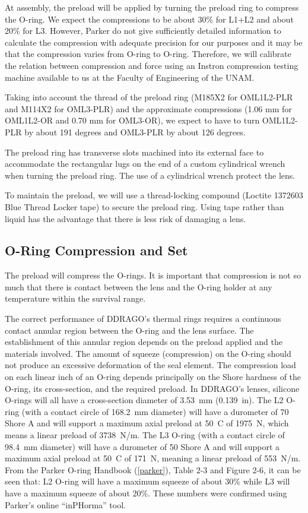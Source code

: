 \documentclass{article}
\begin{document}
At assembly, the preload will be applied by turning the preload ring to compress the O-ring. We expect the compressions to be about 30\% for L1+L2 and about 20\% for L3. However, Parker do not give sufficiently detailed information to calculate the compression with adequate precision for our purposes and it may be that the compression varies from O-ring to O-ring. Therefore, we will calibrate the relation between compression and force using an Instron compression testing machine available to us at the Faculty of Engineering of the UNAM.

Taking into account the thread of the preload ring (M185X2 for OML1L2-PLR and M114X2 for OML3-PLR) and the approximate compressions (1.06 mm for OML1L2-OR and 0.70 mm for OML3-OR), we expect to have to turn OML1L2-PLR by about 191 degrees and OML3-PLR by about 126 degrees.

The preload ring has transverse slots machined into its external face to accommodate the rectangular lugs on the end of a custom cylindrical wrench when turning the preload ring. The use of a cylindrical wrench protect the lens.

To maintain the preload, we will use a thread-locking compound (Loctite 1372603 Blue Thread Locker tape) to secure the preload ring. Using tape rather than liquid has the advantage that there is less risk of damaging a lens.

\subsection{O-Ring Compression and Set}

The preload will compress the O-rings. It is important that compression is not so much that there is contact between the lens and the O-ring holder at any temperature within the survival range.

The correct performance of DDRAGO’s thermal rings requires a continuous contact annular region
between the O-ring and the lens surface. The establishment of this annular region depends on the preload applied and the materials involved. The amount of squeeze (compression) on the O-ring should not produce an excessive deformation of the seal element. The compression load on each linear inch of an O-ring depends principally on the Shore hardness of the O-ring, its
cross-section, and the required preload. In DDRAGO’s lenses, silicone O-rings will all have a cross-section diameter of 3.53~mm (0.139~in). The L2 O-ring (with a contact circle of 168.2~mm diameter) will have a durometer of 70 Shore A and will support a
maximum axial preload at 50~C of 1975~N, which means a linear preload of 3738~N/m.
The L3 O-ring (with a contact circle of 98.4~mm diameter) will have a durometer of 50 Shore A and will support a
maximum axial preload at 50~C of 171~N, meaning a linear preload of 553~N/m.
From the Parker O-ring Handbook (\ref{parker}), Table 2-3 and Figure 2-6, it can be seen that:
L2 O-ring will have a maximum squeeze of about 30\% while L3 will have a maximum squeeze of about 20\%. These numbers were confirmed using Parker’s online “inPHorma” tool.
\end{document}
